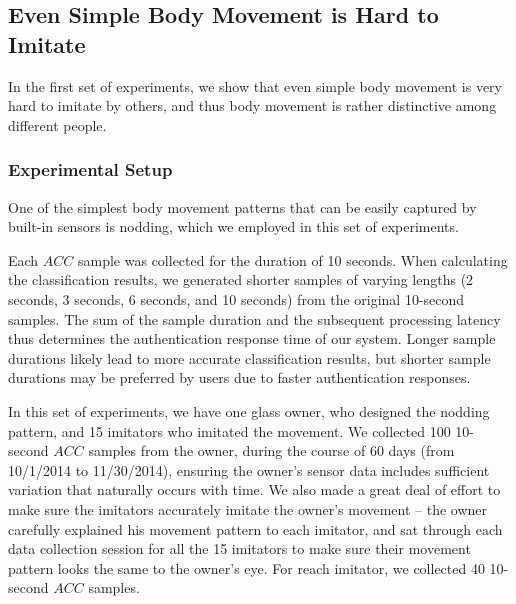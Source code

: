 \subsection{Even Simple Body Movement is Hard to Imitate}\label{sec:experimenr2}
In the first set of experiments, we show that even simple body movement is very hard to imitate by others, and thus body movement is rather distinctive among different people.

\subsubsection{Experimental Setup}
One of the simplest body movement patterns that can be easily captured by built-in sensors is nodding, which we employed in this set of experiments.

Each $ACC$ sample was collected for the duration of 10 seconds. When calculating the classification results, we generated shorter samples of varying lengths (2 seconds, 3 seconds, 6 seconds, and 10 seconds) from the original 10-second samples. The sum of the sample duration and the subsequent processing latency thus determines the authentication response time of our system. Longer sample durations likely lead to more accurate classification results, but shorter sample durations may be preferred by users due to faster authentication responses.

In this set of experiments, we have one glass owner, who designed the nodding pattern,  and 15 imitators who imitated the movement. We collected 100 10-second $ACC$ samples from the owner, during the course of 60 days (from 10/1/2014 to 11/30/2014), ensuring the owner's sensor data includes sufficient variation that naturally occurs with time. We also made a great deal of effort to make sure the imitators accurately imitate the owner's movement -- the owner carefully explained his movement pattern to each imitator, and sat through each data collection session for all the 15 imitators to make sure their movement pattern looks the same to the owner's eye. For reach imitator, we collected 40 10-second $ACC$ samples.

